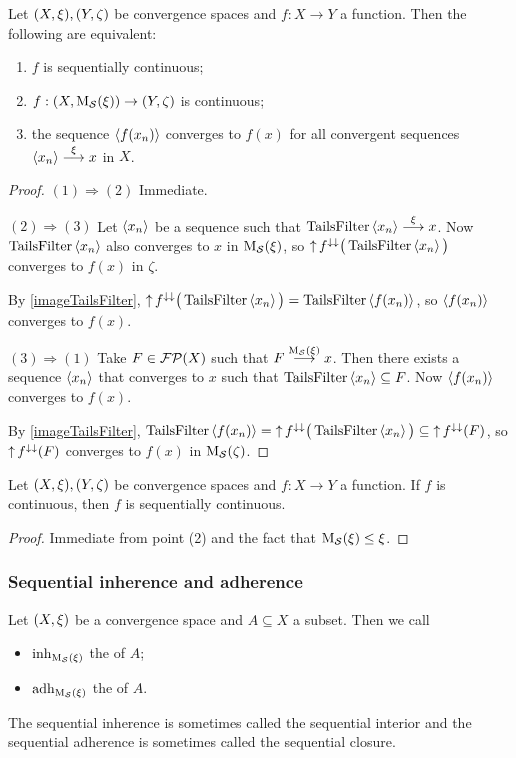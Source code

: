 \begin{proposition}
Let $\sSet{X,\xi}, \sSet{Y,\zeta}$ be convergence spaces and $f:X\to Y$ a function. Then the following are equivalent:
\begin{enumerate}
\item $f$ is sequentially continuous;
\item $f: \sSet{X, \seqMod(\xi)} \to \sSet{Y, \zeta}$ is continuous;
\item the sequence $\left\langle f(x_n) \right\rangle$ converges to $f(x)$ for all convergent sequences $\left\langle x_n \right\rangle\overset{\xi}{\longrightarrow} x$ in $X$.
\end{enumerate}
\end{proposition}
\begin{proof}
$(1) \Rightarrow (2)$ Immediate.

$(2) \Rightarrow (3)$ Let $\left\langle x_n \right\rangle$ be a sequence such that $\operatorname{TailsFilter}\left\langle x_n \right\rangle\overset{\xi}{\longrightarrow} x$. Now $\operatorname{TailsFilter}\left\langle x_n \right\rangle$ also converges to $x$ in $\operatorname{M_\mathcal{S}}(\xi)$, so $\operatorname{\uparrow} f^{\downarrow\downarrow}\big(\operatorname{TailsFilter}\left\langle x_n \right\rangle\big)$ converges to $f(x)$ in $\zeta$.

By \ref{imageTailsFilter}, $\operatorname{\uparrow} f^{\downarrow\downarrow}\big(\operatorname{TailsFilter}\left\langle x_n \right\rangle\big) = \operatorname{TailsFilter}\left\langle f(x_n) \right\rangle$, so $\left\langle f(x_n) \right\rangle$ converges to $f(x)$.

$(3) \Rightarrow (1)$ Take $F\in \operatorname{\mathcal{FP}}(X)$ such that $F\overset{\operatorname{M_\mathcal{S}}(\xi)}{\longrightarrow} x$. Then there exists a sequence $\left\langle x_n \right\rangle$ that converges to $x$ such that $\operatorname{TailsFilter}\left\langle x_n \right\rangle\subseteq F$. Now $\left\langle f(x_n) \right\rangle$ converges to $f(x)$. 

By \ref{imageTailsFilter}, $\operatorname{TailsFilter}\left\langle f(x_n) \right\rangle = \operatorname{\uparrow} f^{\downarrow\downarrow}\big(\operatorname{TailsFilter}\left\langle x_n \right\rangle\big) \subseteq \operatorname{\uparrow} f^{\downarrow\downarrow}(F)$, so $\operatorname{\uparrow} f^{\downarrow\downarrow}(F)$ converges to $f(x)$ in $\operatorname{M_\mathcal{S}}(\zeta)$.
\end{proof}
\begin{corollary} \label{continuityImpliesSequentialContinuity}
Let $\sSet{X,\xi}, \sSet{Y,\zeta}$ be convergence spaces and $f:X\to Y$ a function. If $f$ is continuous, then $f$ is sequentially continuous.
\end{corollary}
\begin{proof}
Immediate from point (2) and the fact that $\operatorname{M_\mathcal{S}}(\xi) \leq \xi$.
\end{proof}

\subsubsection{Sequential inherence and adherence}
\begin{definition}
Let $\sSet{X,\xi}$ be a convergence space and $A\subseteq X$ a subset. Then we call
\begin{itemize}
\item $\operatorname{inh}_{\operatorname{M_\mathcal{S}}(\xi)}$ the  of $A$;
\item $\operatorname{adh}_{\operatorname{M_\mathcal{S}}(\xi)}$ the  of $A$.
\end{itemize}
\end{definition}
The sequential inherence is sometimes called the sequential interior and the sequential adherence is sometimes called the sequential closure.

